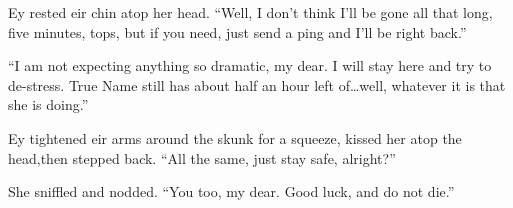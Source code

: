 Ey rested eir chin atop her head. ``Well, I don't think I'll be gone all that long, five minutes, tops, but if you need, just send a ping and I'll be right back.''

``I am not expecting anything so dramatic, my dear. I will stay here and try to de-stress. True Name still has about half an hour left of\ldots well, whatever it is that she is doing.''

Ey tightened eir arms around the skunk for a squeeze, kissed her atop the head,then stepped back. ``All the same, just stay safe, alright?''

She sniffled and nodded. ``You too, my dear. Good luck, and do not die.''
